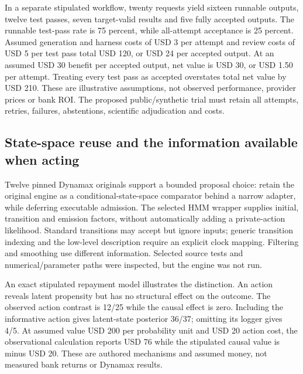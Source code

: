 In a separate stipulated workflow, twenty requests yield sixteen
runnable outputs, twelve test passes, seven target-valid results and
five fully accepted outputs. The runnable test-pass rate is 75 percent,
while all-attempt acceptance is 25 percent. Assumed generation and
harness costs of USD 3 per attempt and review costs of USD 5 per test
pass total USD 120, or USD 24 per accepted output. At an assumed USD 30
benefit per accepted output, net value is USD 30, or USD 1.50 per
attempt. Treating every test pass as accepted overstates total net value
by USD 210. These are illustrative assumptions, not observed
performance, provider prices or bank ROI. The proposed public/synthetic
trial must retain all attempts, retries, failures, abstentions,
scientific adjudication and costs. \citep{exec19_surveys_reference}

\hypertarget{state-space-reuse-and-the-information-available-when-acting}{%
\subsection{State-space reuse and the information available when
acting}\label{state-space-reuse-and-the-information-available-when-acting}}

Twelve pinned Dynamax originals support a bounded proposal choice:
retain the original engine as a conditional-state-space comparator
behind a narrow adapter, while deferring executable admission. The
selected HMM wrapper supplies initial, transition and emission factors,
without automatically adding a private-action likelihood. Standard
transitions may accept but ignore inputs; generic transition indexing
and the low-level description require an explicit clock mapping.
Filtering and smoothing use different information. Selected source tests
and numerical/parameter paths were inspected, but the engine was not
run. \citep{exec19_dynamax_source}

An exact stipulated repayment model illustrates the distinction. An
action reveals latent propensity but has no structural effect on the
outcome. The observed action contrast is 12/25 while the causal effect
is zero. Including the informative action gives latent-state posterior
36/37; omitting its logger gives 4/5. At assumed value USD 200 per
probability unit and USD 20 action cost, the observational calculation
reports USD 76 while the stipulated causal value is minus USD 20. These
are authored mechanisms and assumed money, not measured bank returns or
Dynamax results.\citep{exec19_dynamax_reference}


